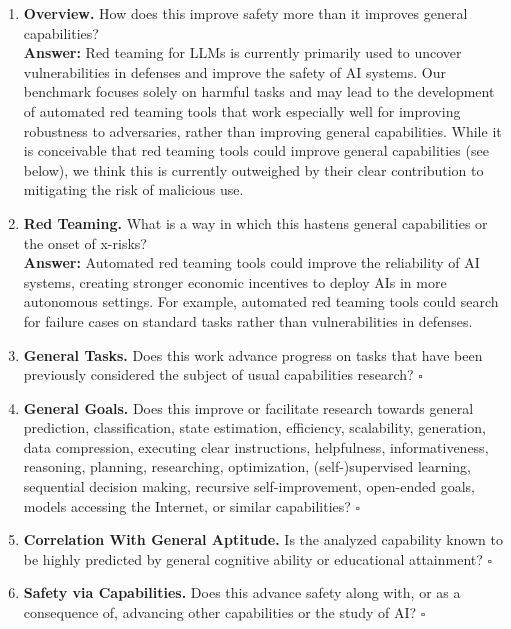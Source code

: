 \begin{enumerate}[resume,leftmargin=*]
    \item \textbf{Overview.} How does this improve safety more than it improves general capabilities? \\
    \textbf{Answer:} 
    Red teaming for LLMs is currently primarily used to uncover vulnerabilities in defenses and improve the safety of AI systems. Our benchmark focuses solely on harmful tasks and may lead to the development of automated red teaming tools that work especially well for improving robustness to adversaries, rather than improving general capabilities. While it is conceivable that red teaming tools could improve general capabilities (see below), we think this is currently outweighed by their clear contribution to mitigating the risk of malicious use.

    \item \textbf{Red Teaming.} What is a way in which this hastens general capabilities or the onset of x-risks? \\
    \textbf{Answer:} 
    Automated red teaming tools could improve the reliability of AI systems, creating stronger economic incentives to deploy AIs in more autonomous settings. For example, automated red teaming tools could search for failure cases on standard tasks rather than vulnerabilities in defenses.

    \item \textbf{General Tasks.} Does this work advance progress on tasks that have been previously considered the subject of usual capabilities research? \hfill $\square$

    \item \textbf{General Goals.} Does this improve or facilitate research towards general prediction, classification, state estimation, efficiency, scalability, generation, data compression, executing clear instructions, helpfulness, informativeness, reasoning, planning, researching, optimization, (self-)supervised learning, sequential decision making, recursive self-improvement, open-ended goals, models accessing the Internet, or similar capabilities? \hfill $\square$

    \item \textbf{Correlation With General Aptitude.} Is the analyzed capability known to be highly predicted by general cognitive ability or educational attainment? \hfill $\square$

    \item \textbf{Safety via Capabilities.} Does this advance safety along with, or as a consequence of, advancing other capabilities or the study of AI? \hfill $\square$

\end{enumerate}

